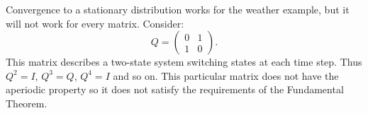 \documentclass[12pt]{article}
\begin{document}
\begin{example}
    Convergence to a stationary distribution works for the weather
    example, but it will not work for every matrix. Consider:
    \[
        Q =
        \begin{pmatrix}
            0 & 1 \\
            1 & 0
        \end{pmatrix}
        .
    \] This matrix describes a two-state system switching states at each
    time step.  Thus \( Q^2 = I \), \( Q^3=Q \), \( Q^4=I \) and so on.
    This particular matrix does not have the aperiodic 
    property so it does not satisfy the requirements of the Fundamental Theorem.
\end{example}



\end{document}
